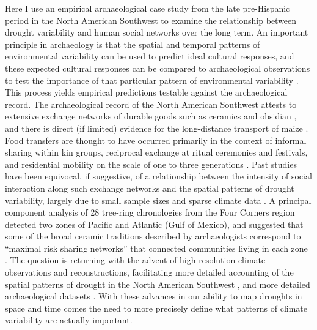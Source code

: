 \documentclass[10pt]{iopart}
\begin{document}
Here I use an empirical archaeological case study from the late pre-Hispanic period in the North American Southwest to examine the relationship between drought variability and human social networks over the long term. An important principle in archaeology is that the spatial and temporal patterns of environmental variability can be used to predict ideal cultural responses, and these expected cultural responses can be compared to archaeological observations to test the importance of that particular pattern of environmental variability \parencite{Halstead1989}. This process yields empirical predictions testable against the archaeological record. The archaeological record of the North American Southwest attests to extensive exchange networks of durable goods such as ceramics and obsidian \parencite{Mills2013a}, and there is direct (if limited) evidence for the long-distance transport of maize \parencite{Benson2010, Benson2010WhoDrought}. Food transfers are thought to have occurred primarily in the context of informal sharing within kin groups, reciprocal exchange at ritual ceremonies and festivals, and residential mobility on the scale of one to three generations \parencite{Hegmon1991,Hegmon1996,Varien1999,Cordell2007,Spiemann1983}. Past studies have been equivocal, if suggestive, of a relationship between the intensity of social interaction along such exchange networks and the spatial patterns of drought variability, largely due to small sample sizes and sparse climate data \parencite{Rautman1993a,Johnson1990ChumashAnalysis}. A principal component analysis of 28 tree-ring chronologies from the Four Corners region detected two zones of Pacific and Atlantic (Gulf of Mexico), and suggested that some of the broad ceramic traditions described by archaeologists correspond to ``maximal risk sharing networks'' that connected communities living in each zone \parencite{Cordell2007}. The question is returning with the advent of high resolution climate observations and reconstructions, facilitating more detailed accounting of the spatial patterns of drought in the North American Southwest \parencite{Strawhacker2017RiskProvince}, and more detailed archaeological datasets \parencite{Borck2015}. With these advances in our ability to map droughts in space and time comes the need to more precisely define what patterns of climate variability are actually important.
\end{document}
